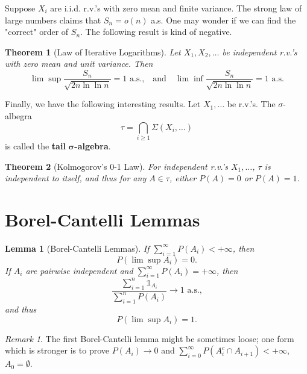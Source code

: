 \documentclass[openany]{book}
\newtheorem{lemma}{Lemma}[chapter]
\newtheorem{theorem}{Theorem}[chapter]
\theoremstyle{definition}
\theoremstyle{remark}
\newtheorem*{remark}{Remark}
\begin{document}
Suppose $X_i$ are i.i.d. r.v.'s with zero mean and finite variance. The strong law of large numbers claims that $S_n=o(n)$ a.s. One may wonder if we can find the "correct" order of $S_n$. The following result is kind of negative.
\begin{theorem}[Law of Iterative Logarithms]
    Let $X_1,X_2,\ldots$ be independent r.v.'s with zero mean and unit variance. Then
    \begin{equation*}
        \lim\sup\frac{S_n}{\sqrt{2n\ln\ln n}}=1\textrm{ a.s.,}\quad\textrm{and}\quad\lim\inf\frac{S_n}{\sqrt{2n\ln\ln n}}=1\textrm{ a.s.}
    \end{equation*}
\end{theorem}

Finally, we have the following interesting results. Let $X_1,\ldots$ be r.v.'s. The $\sigma$-albegra
\begin{equation*}
    \tau=\bigcap_{i\ge1}\Sigma\left(X_i,\ldots\right)
\end{equation*}
is called the \textbf{tail} $\boldsymbol{\sigma}$\textbf{-algebra}.
\begin{theorem}[Kolmogorov's 0-1 Law]
    For independent r.v.'s $X_1,\ldots$, $\tau$ is independent to itself, and thus for any $A\in\tau$, either $P(A)=0$ or $P(A)=1$.
\end{theorem}

\section{Borel-Cantelli Lemmas}\label{sec:BorelCantelli}
\begin{lemma}[Borel-Cantelli Lemmas]
    If $\sum_{i=1}^{\infty}P(A_i)<+\infty$, then
    \begin{equation*}
        P\left(\lim\sup A_i\right)=0.
    \end{equation*}
    If $A_i$ are pairwise independent and $\sum_{i=1}^{\infty}P(A_i)=+\infty$, then
    \begin{equation*}
        \frac{\sum_{i=1}^{n}\mathds{1}_{A_i}}{\sum_{i=1}^{n}P(A_i)}\to1\textrm{ a.s.,}
    \end{equation*}
    and thus
    \begin{equation*}
        P\left(\lim\sup A_i\right)=1.
    \end{equation*}
\end{lemma}
\begin{remark}
    The first Borel-Cantelli lemma might be sometimes loose; one form which is stronger is to prove $P(A_i)\to0$ and $\sum_{i=0}^{\infty}P\left(A_i^c\cap A_{i+1}\right)<+\infty$, $A_0=\emptyset$.
\end{remark}
\end{document}
